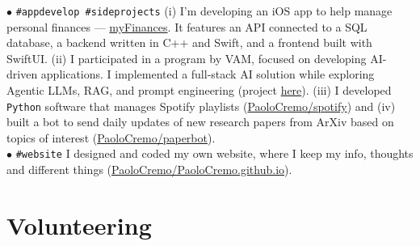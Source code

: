 \documentclass[letterpaper]{twentysecondcv} %
\begin{document}
$\bullet$ \texttt{\#appdevelop \#sideprojects} %
          {\small
          (i) I'm developing an iOS app to help manage personal finances — \href{https://github.com/PaoloCremo/myfinances}{myFinances}. It features an API connected to a SQL database, a backend written in C++ and Swift, and a frontend built with SwiftUI.
          (ii) I participated in a program by VAM, focused on developing AI-driven applications. I implemented a full-stack AI solution while exploring Agentic LLMs, RAG, and prompt engineering (project \href{https://paolocremonese.com/tb}{here}). %
          (iii) I developed \texttt{Python} software that manages Spotify playlists (\href{https://github.com/PaoloCremo/spotify}{PaoloCremo/spotify}) and (iv) built a bot to send daily updates of new research papers from ArXiv based on topics of interest (\href{https://github.com/PaoloCremo/paperbot}{PaoloCremo/paperbot}).
          }\\
$\bullet$ \texttt{\#website}   
          {\small I designed and coded my own website, where I keep my info, thoughts and different things (\href{https://github.com/PaoloCremo/PaoloCremo.github.io}{PaoloCremo/PaoloCremo.github.io}).}



% 


\section{Volunteering}
\end{document}
